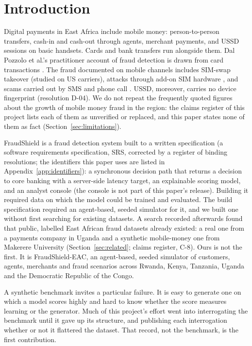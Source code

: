 \section{Introduction}
\label{sec:introduction}

Digital payments in East Africa include mobile money: person-to-person transfers, cash-in and
cash-out through agents, merchant payments, and USSD sessions on basic handsets. Cards and bank
transfers run alongside them. Dal Pozzolo et al.'s practitioner account of fraud detection is drawn
from card transactions \cite{dalpozzolo2014lessons}. The fraud documented on mobile channels includes
SIM-swap takeover \cite{lee2020simswap} (studied on US carriers), attacks through add-on SIM hardware
\cite{phipps2018thinsim}, and scams carried out by SMS and phone call
\cite{razaq2021scams,dogan2025grift}. USSD, moreover, carries no device fingerprint (resolution D-04).
We do not repeat the frequently quoted figures about the growth of mobile money fraud in the region: the
claims register of this project lists each of them as unverified or replaced, and this paper states
none of them as fact (Section~\ref{sec:limitations}).

FraudShield is a fraud detection system built to a written specification (a software requirements
specification, SRS, corrected by a register of \nResolutions{} binding resolutions; the identifiers
this paper uses are listed in Appendix~\ref{app:identifiers}): a synchronous decision path that
returns a decision to core banking with a server-side latency target, an explainable scoring model,
and an analyst console (the console is not part of this paper's release). Building it required data on
which the model could be trained and evaluated. The build specification required an agent-based,
seeded simulator for it, and we built one without first searching for existing
datasets. A search recorded afterwards found that public, labelled East African fraud
datasets already existed: a real one from a payments company in Uganda and a synthetic mobile-money
one from Makerere University (Section~\ref{sec:related}; claims register, C-8). Ours is not the first.
It is FraudShield-EAC, an agent-based, seeded simulator of customers, agents, merchants and
\nScenarios{} fraud scenarios across Rwanda, Kenya, Tanzania, Uganda and the Democratic Republic of
the Congo.

A synthetic benchmark invites a particular failure. It is easy to generate one on which a model
scores highly and hard to know whether the score measures learning or the generator. Much of this
project's effort went into interrogating the benchmark until it gave up its structure, and
publishing each interrogation whether or not it flattered the dataset. That record, not the
benchmark, is the first contribution.

